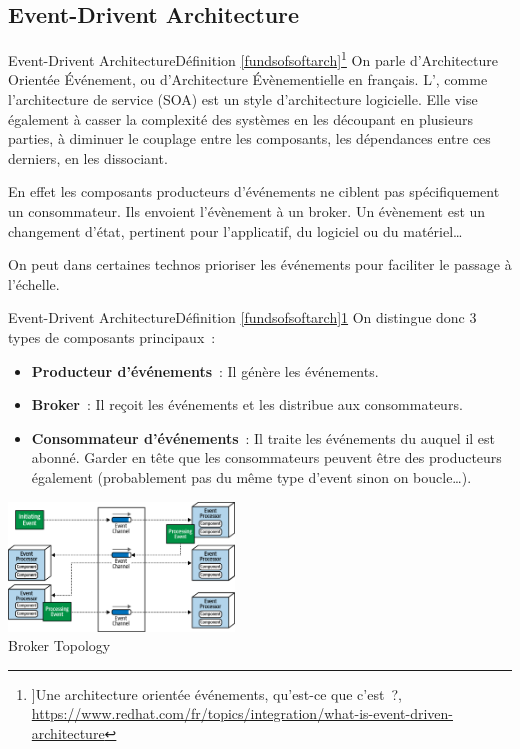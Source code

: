 \documentclass{beamer}
\begin{document}
    \subsection{Event-Drivent Architecture}\label{subsec:event-drivent-architecture}

    \begin{frame}{Event-Drivent Architecture}{Définition \cref{fundsofsoftarch}\footnotestep\footnote{\label{redhateda}]Une architecture orientée événements, qu'est-ce que c'est~?, \url{https://www.redhat.com/fr/topics/integration/what-is-event-driven-architecture}}}
        On parle d'Architecture Orientée Événement, ou d'Architecture Évènementielle en français.
        L', comme l'architecture de service (SOA) est un style d'architecture logicielle.
        \bigbreak
        Elle vise également à casser la complexité des systèmes en les découpant en plusieurs parties, à diminuer le couplage entre les composants, les dépendances entre ces derniers, en les dissociant.

        En effet les composants producteurs d'événements ne ciblent pas spécifiquement un consommateur.
        Ils envoient l'évènement à un broker.
        \bigbreak
        Un évènement est un changement d'état, pertinent pour l'applicatif, du logiciel ou du matériel\ldots

        On peut dans certaines technos prioriser les événements pour faciliter le passage à l'échelle.
    \end{frame}

    \begin{frame}{Event-Drivent Architecture}{Définition \cref{fundsofsoftarch}\footnotestep\cref{redhateda}}
        On distingue donc 3 types de composants principaux~:
        \begin{itemize}
            \item \textbf{Producteur d'événements}~: Il génère les événements.
            \item \textbf{Broker}~: Il reçoit les événements et les distribue aux consommateurs.
            \item \textbf{Consommateur d'événements}~: Il traite les événements du  auquel il est abonné.
            Garder en tête que les consommateurs peuvent être des producteurs également (probablement pas du même type d'event sinon on boucle\ldots).
        \end{itemize}
        \bigbreak
        \centering
        \includegraphics[width=6cm]{image/event-driven-broker-topology} \\ Broker Topology \\
    \end{frame}
\end{document}

